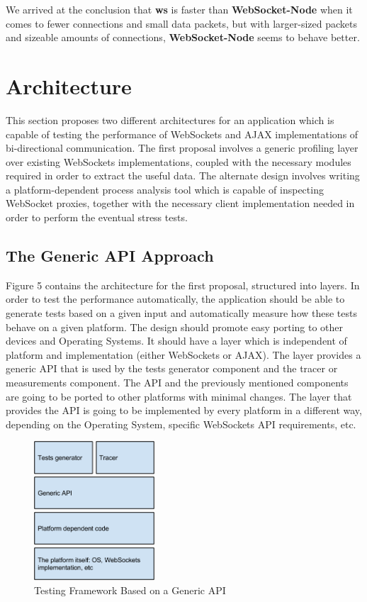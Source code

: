 \documentclass[conference]{IEEEtran}
\begin{document}
We arrived at the conclusion that \textbf{ws} is faster than
\textbf{WebSocket-Node} when it comes to fewer connections and small data
packets, but with larger-sized packets and sizeable amounts of connections,
\textbf{WebSocket-Node} seems to behave better.

\section{Architecture}
This section proposes two different architectures for an application which is capable
of testing the performance of WebSockets and AJAX implementations of bi-directional
communication. The first proposal involves a generic profiling layer over
existing WebSockets implementations, coupled with the necessary modules required
in order to extract the useful data. The alternate design involves writing a
platform-dependent process analysis tool which is capable of inspecting WebSocket
proxies, together with the necessary client implementation needed in order to
perform the eventual stress tests.

\subsection{The Generic API Approach}
Figure 5 contains the architecture for the first proposal, structured into layers.
In order to test the performance automatically, the application should be able
to generate tests based on a given input and automatically measure how these tests
behave on a given platform. The design should promote easy porting to other devices
and Operating Systems. It should have a layer which is independent of 
platform and implementation (either WebSockets or AJAX). The layer provides a generic
API that is used by the tests generator component and the tracer or measurements
component. The API and the previously mentioned components are going to be ported
to other platforms with minimal changes. The layer that provides the API is going
to be implemented by every platform in a different way, depending on the
Operating System, specific WebSockets API requirements, etc.
\begin{frame}{}
  \begin{figure}
    \centering
    \includegraphics[width=0.4\textwidth]{img/architecture.png}
    \caption{Testing Framework Based on a Generic API}
  \end{figure}
\end{frame}
\\
\end{document}

